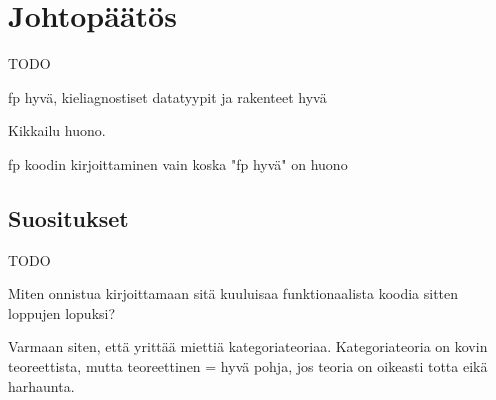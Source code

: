 \vspace{21.5pt}
\chapter{Johtopäätös}

TODO

\gls{fp} hyvä, kieliagnostiset datatyypit ja rakenteet hyvä

Kikkailu huono.

fp koodin kirjoittaminen vain koska "fp hyvä" on huono

\section{Suositukset}

TODO

Miten onnistua kirjoittamaan sitä kuuluisaa funktionaalista koodia sitten loppujen lopuksi?

Varmaan siten, että yrittää miettiä kategoriateoriaa. Kategoriateoria on kovin teoreettista, mutta teoreettinen = hyvä pohja, jos teoria on oikeasti totta eikä harhaunta.
